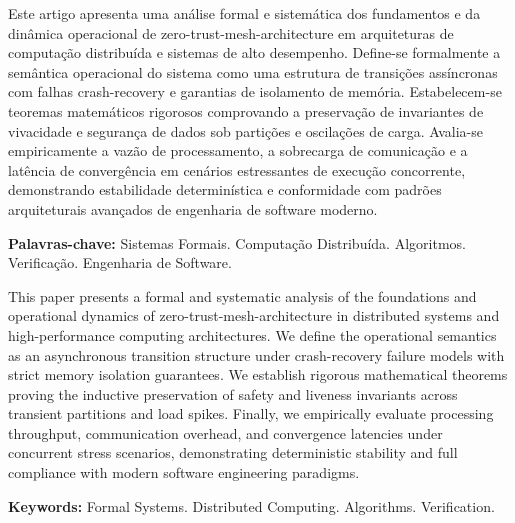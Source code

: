 \documentclass[
  article,
  12pt,
  oneside,
  a4paper,
  english,
  brazil
]{abntex2}
\begin{document}

\maketitle

\begin{resumoumacoluna}
Este artigo apresenta uma análise formal e sistemática dos fundamentos e da dinâmica operacional de zero-trust-mesh-architecture em arquiteturas de computação distribuída e sistemas de alto desempenho. Define-se formalmente a semântica operacional do sistema como uma estrutura de transições assíncronas com falhas crash-recovery e garantias de isolamento de memória. Estabelecem-se teoremas matemáticos rigorosos comprovando a preservação de invariantes de vivacidade e segurança de dados sob partições e oscilações de carga. Avalia-se empiricamente a vazão de processamento, a sobrecarga de comunicação e a latência de convergência em cenários estressantes de execução concorrente, demonstrando estabilidade determinística e conformidade com padrões arquiteturais avançados de engenharia de software moderno.

\vspace{\onelineskip}
\noindent
\textbf{Palavras-chave:} Sistemas Formais. Computação Distribuída. Algoritmos. Verificação. Engenharia de Software.
\end{resumoumacoluna}

\begin{resumoumacoluna}[Abstract]
This paper presents a formal and systematic analysis of the foundations and operational dynamics of zero-trust-mesh-architecture in distributed systems and high-performance computing architectures. We define the operational semantics as an asynchronous transition structure under crash-recovery failure models with strict memory isolation guarantees. We establish rigorous mathematical theorems proving the inductive preservation of safety and liveness invariants across transient partitions and load spikes. Finally, we empirically evaluate processing throughput, communication overhead, and convergence latencies under concurrent stress scenarios, demonstrating deterministic stability and full compliance with modern software engineering paradigms.

\vspace{\onelineskip}
\noindent
\textbf{Keywords:} Formal Systems. Distributed Computing. Algorithms. Verification.
\end{resumoumacoluna}
\end{document}
